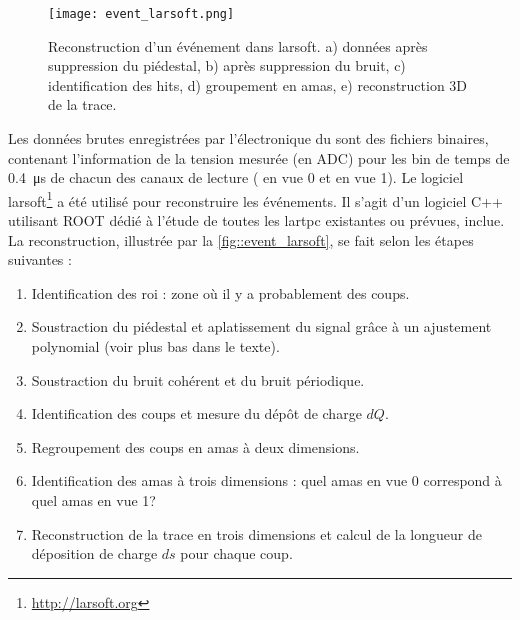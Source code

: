         \begin{figure}[htbp]
          \centering
          \texttt{[image: event\_larsoft.png]}
          \caption[Reconstruction d'un événement dans LArSoft]{\label{fig::event_larsoft}Reconstruction d'un événement dans \gls{larsoft}. a) données après suppression du piédestal, b) après suppression du bruit, c) identification des hits, d) groupement en amas, e) reconstruction 3D de la trace.}
        \end{figure}
        Les données brutes enregistrées par l'électronique du \TOO{} sont des fichiers binaires, contenant l'information de la tension mesurée (en ADC) pour les  bin de temps de \SI{0.4}{\micro\second} de chacun des  canaux de lecture ( en vue 0 et  en vue 1). Le logiciel \gls{larsoft}\footnote{\url{http://larsoft.org}} a été utilisé pour reconstruire les événements. Il s'agit d'un logiciel C++ utilisant ROOT dédié à l'étude de toutes les \gls{lartpc} existantes ou prévues, \protodp{} inclue.  La reconstruction, illustrée par la \autoref{fig::event_larsoft}, se fait selon les étapes suivantes :
        \begin{enumerate}
          \item Identification des \gls{roi} : zone où il y a probablement des coups.
          \item Soustraction du piédestal et aplatissement du signal grâce à un ajustement polynomial (voir plus bas dans le texte).
          \item Soustraction du bruit cohérent et du bruit périodique.
          \item Identification des coups et mesure du dépôt de charge $dQ$.
          \item Regroupement des coups en amas à deux dimensions.
          \item Identification des amas à trois dimensions : quel amas en vue 0 correspond à quel amas en vue 1?
          \item Reconstruction de la trace en trois dimensions et calcul de la longueur de déposition de charge $ds$ pour chaque coup.
        \end{enumerate}
